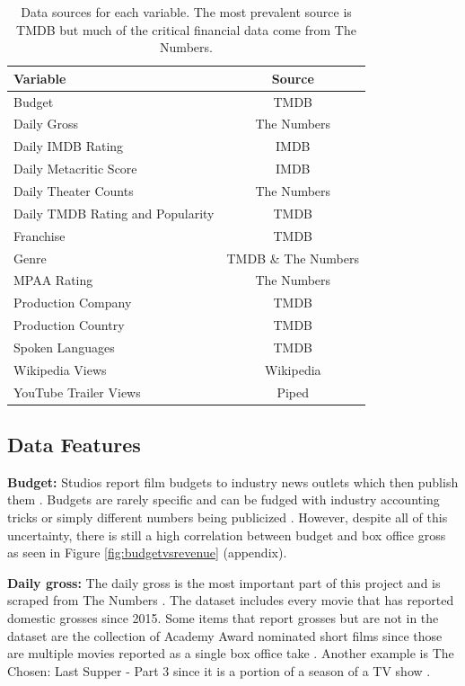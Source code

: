 \documentclass[12pt]{article}
\begin{document}
\begin{table}[H]
    \centering
    \begin{tabular}{lc}
        \toprule
        Variable & Source \\
        \midrule
        Budget & TMDB \\
        Daily Gross & The Numbers \\
        Daily IMDB Rating & IMDB \\
        Daily Metacritic Score & IMDB \\
        Daily Theater Counts & The Numbers \\
        Daily TMDB Rating and Popularity & TMDB \\
        Franchise & TMDB \\
        Genre & TMDB \& The Numbers \\
        MPAA Rating & The Numbers \\
        Production Company & TMDB \\
        Production Country & TMDB \\
        Spoken Languages & TMDB \\
        Wikipedia Views & Wikipedia \\
        YouTube Trailer Views & Piped \\
        \bottomrule
    \end{tabular}
    \caption{Data sources for each variable. The most prevalent source is TMDB but much of the critical financial data come from The Numbers.}
    \label{tab:data}
\end{table}

\subsection{Data Features} \label{sssec:datafeatures}
\textbf{Budget:} Studios report film budgets to industry news outlets which then publish them \citep{paddingtonBudget}. Budgets are rarely specific and can be fudged with industry accounting tricks or simply different numbers being publicized \citep{hollywoodAccounting,lyingBudgets}. However, despite all of this uncertainty, there is still a high correlation between budget and box office gross as seen in Figure \ref{fig:budgetvsrevenue} (appendix).

\textbf{Daily gross:} The daily gross is the most important part of this project and is scraped from The Numbers \citep{numbersHome}. The dataset includes every movie that has reported domestic grosses since 2015. Some items that report grosses but are not in the dataset are the collection of Academy Award nominated short films since those are multiple movies reported as a single box office take \citep{academyAwardsShortFilms}. Another example is The Chosen: Last Supper - Part 3 since it is a portion of a season of a TV show \citep{chosenLastSupper}.
\end{document}
